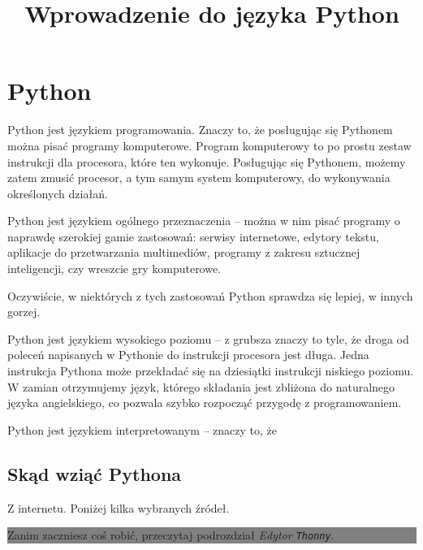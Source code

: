 \documentclass[a4paper]{article}
\title{Wprowadzenie do języka Python}
\newcommand{\important}[1]{
    \begin{center}\colorbox{gray}{
        \begin{minipage}[t]{0.9\textwidth}{#1}
        \end{minipage}
    }
    \end{center}
}
\begin{document}
\maketitle
\tableofcontents


\section{Python}
Python jest językiem programowania. Znaczy to, że posługując się Pythonem można pisać programy komputerowe. Program komputerowy to po prostu zestaw instrukcji dla procesora, które ten wykonuje. Posługując się Pythonem, możemy zatem zmusić procesor, a tym samym system komputerowy, do wykonywania określonych działań.

Python jest językiem ogólnego przeznaczenia -- można w nim pisać programy o naprawdę szerokiej gamie zastosowań: serwisy internetowe, edytory tekstu, aplikacje do przetwarzania multimediów, programy z zakresu sztucznej inteligencji, czy wreszcie gry komputerowe.

Oczywiście, w niektórych z tych zastosowań Python sprawdza się lepiej, w innych gorzej.


Python jest językiem wysokiego poziomu -- z grubsza znaczy to tyle, że droga od poleceń napisanych w Pythonie do instrukcji procesora jest długa. Jedna instrukcja Pythona może przekładać się na dziesiątki instrukcji niskiego poziomu. W zamian otrzymujemy język, którego składania jest zbliżona do naturalnego języka angielskiego, co pozwala szybko rozpocząć przygodę z programowaniem.

Python jest językiem interpretowanym -- znaczy to, że


\subsection{Skąd wziąć Pythona}

Z internetu. Poniżej kilka wybranych źródeł.

\important{Zanim zaczniesz coś robić, przeczytaj podrozdział \emph{Edytor \texttt{Thonny}}.}
\end{document}
